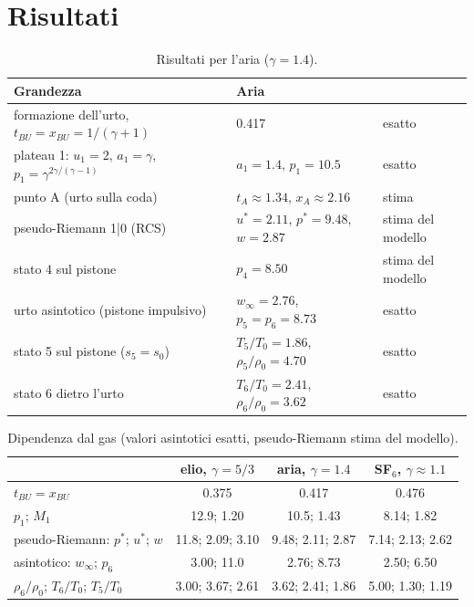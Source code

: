 \documentclass[11pt,a4paper]{article}
\begin{document}
\section{Risultati}
\begin{table}[H]
  \centering
  \small
  \begin{tabular}{lll}
    \toprule
    Grandezza & Aria & \\
    \midrule
    formazione dell'urto, $t_{BU}=x_{BU}=1/(\gamma+1)$ & \num{0.417} & esatto \\
    plateau 1: $u_1=2$, $a_1=\gamma$, $p_1=\gamma^{2\gamma/(\gamma-1)}$ & $a_1=\num{1.4}$, $p_1=\num{10.5}$ & esatto \\
    punto A (urto sulla coda) & $t_A\approx\num{1.34}$, $x_A\approx\num{2.16}$ & stima \\
    pseudo-Riemann 1|0 (RCS) & $u^*=\num{2.11}$, $p^*=\num{9.48}$, $w=\num{2.87}$ & stima del modello \\
    stato 4 sul pistone & $p_4=\num{8.50}$ & stima del modello \\
    urto asintotico (pistone impulsivo) & $w_\infty=\num{2.76}$, $p_5=p_6=\num{8.73}$ & esatto \\
    stato 5 sul pistone ($s_5=s_0$) & $T_5/T_0=\num{1.86}$, $\rho_5/\rho_0=\num{4.70}$ & esatto \\
    stato 6 dietro l'urto & $T_6/T_0=\num{2.41}$, $\rho_6/\rho_0=\num{3.62}$ & esatto \\
    \bottomrule
  \end{tabular}
  \caption{Risultati per l'aria ($\gamma=\num{1.4}$).}
\end{table}

\begin{table}[H]
  \centering
  \small
  \begin{tabular}{lccc}
    \toprule
     & elio, $\gamma=5/3$ & aria, $\gamma=\num{1.4}$ & SF$_6$, $\gamma\approx\num{1.1}$ \\
    \midrule
    $t_{BU}=x_{BU}$ & \num{0.375} & \num{0.417} & \num{0.476} \\
    $p_1$; $M_1$ & \num{12.9}; \num{1.20} & \num{10.5}; \num{1.43} & \num{8.14}; \num{1.82} \\
    pseudo-Riemann: $p^*$; $u^*$; $w$ & \num{11.8}; \num{2.09}; \num{3.10} & \num{9.48}; \num{2.11}; \num{2.87} &
      \num{7.14}; \num{2.13}; \num{2.62} \\
    asintotico: $w_\infty$; $p_6$ & \num{3.00}; \num{11.0} & \num{2.76}; \num{8.73} & \num{2.50}; \num{6.50} \\
    $\rho_6/\rho_0$; $T_6/T_0$; $T_5/T_0$ & \num{3.00}; \num{3.67}; \num{2.61} & \num{3.62}; \num{2.41}; \num{1.86} &
      \num{5.00}; \num{1.30}; \num{1.19} \\
    \bottomrule
  \end{tabular}
  \caption{Dipendenza dal gas (valori asintotici esatti, pseudo-Riemann stima del modello).\label{tab:gas}}
\end{table}
\end{document}
